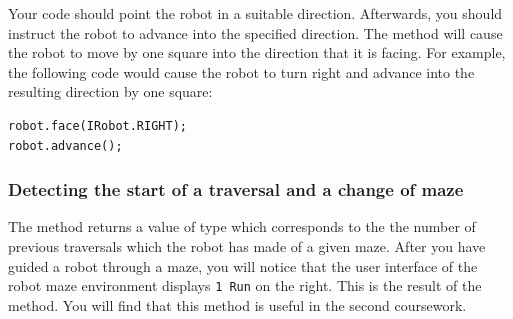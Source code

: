 Your code should point the robot in a suitable direction. Afterwards, you should instruct the robot to advance into the specified direction. The  method will cause the robot to move by one square into the direction that it is facing. For example, the following code would cause the robot to turn right and advance into the resulting direction by one square:

\begin{verbatim}
robot.face(IRobot.RIGHT);
robot.advance();
\end{verbatim}

\subsubsection{Detecting the start of a traversal and a change of maze}

The method  returns a value of type  which corresponds to the the number of previous traversals which the robot has made of a given maze.  After you have guided a robot through a maze, you will notice that the user interface of the robot maze environment displays 
\texttt{1 Run} on the right. This is the result of the  method. You will find that this method is useful in the second coursework.




